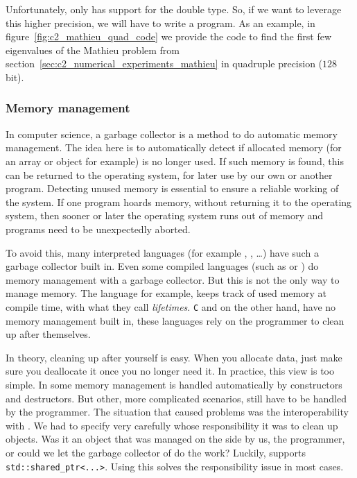 Unfortunately, \lpython{} only has support for the double type. So, if we want to leverage this higher precision, we will have to write a \cpp{} program. As an example, in figure~\ref{fig:c2_mathieu_quad_code} we provide the code to find the first few eigenvalues of the Mathieu problem from section~\ref{sec:c2_numerical_experiments_mathieu} in quadruple precision ($128$ bit).

\subsubsection{Memory management}

In computer science, a garbage collector is a method to do automatic memory management. The idea here is to automatically detect if allocated memory (for an array or object for example) is no longer used. If such memory is found, this can be returned to the operating system, for later use by our own or another program. Detecting unused memory is essential to ensure a reliable working of the system. If one program hoards memory, without returning it to the operating system, then sooner or later the operating system runs out of memory and programs need to be unexpectedly aborted.

To avoid this, many interpreted languages (for example \lpython{}, \javascript{}, \matlab{}\dots) have such a garbage collector built in. Even some compiled languages (such as \java{} or \csharp{}) do memory management with a garbage collector. But this is not the only way to manage memory. The language \rust{} for example, keeps track of used memory at compile time, with what they call \emph{lifetimes}. \texttt{C} and \cpp{} on the other hand, have no memory management built in, these languages rely on the programmer to clean up after themselves.

In theory, cleaning up after yourself is easy. When you allocate data, just make sure you deallocate it once you no longer need it. In practice, this view is too simple. In \cpp{} some memory management is handled automatically by constructors and destructors. But other, more complicated scenarios, still have to be handled by the programmer. The situation that caused problems was the interoperability with \lpython{}. We had to specify very carefully whose responsibility it was to clean up objects. Was it an object that was managed on the \cpp{} side by us, the programmer, or could we let the garbage collector of \lpython{} do the work? Luckily, \pybind{} supports \texttt{std::shared\_ptr<...>}. Using this solves the responsibility issue in most cases.

